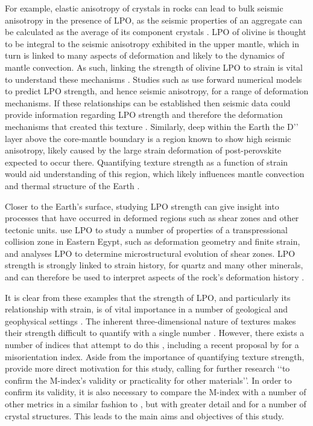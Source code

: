 \documentclass[a4paper,12pt,twoside]{report}
\numberwithin{equation}{chapter}
\begin{document}
For example, elastic anisotropy of crystals in rocks can lead to bulk seismic anisotropy in the presence of LPO, as the seismic properties of an aggregate can be calculated as the average of its component crystals \citep{Tommasi1999}. LPO of olivine is thought to be integral to the seismic anisotropy exhibited in the upper mantle, which in turn is linked to many aspects of deformation and likely to the dynamics of mantle convection. As such, linking the strength of olivine LPO to strain is vital to understand these mechanisms \citep[e.g.][]{Warren2008}. Studies such as \cite{Tommasi2000} use forward numerical models to predict LPO strength, and hence seismic anisotropy, for a range of deformation mechanisms. If these relationships can be established then seismic data could provide information regarding LPO strength and therefore the deformation mechanisms that created this texture \citep[see][for details of a number of other approaches to this problem]{Blackman2002}. Similarly, deep within the Earth the D\rq\rq{} layer \citep{Garnero2008} above the core-mantle boundary is a region known to show high seismic anisotropy, likely caused by the large strain deformation of post-perovskite expected to occur there. Quantifying texture strength as a function of strain would aid understanding of this region, which likely influences mantle convection and thermal structure of the Earth \citep{Miyagi2010}. 

Closer to the Earth's surface, studying LPO strength can give insight into processes that have occurred in deformed regions such as shear zones and other tectonic units. \cite{Unzog2000} use LPO to study a number of properties of a transpressional collision zone in Eastern Egypt, such as deformation geometry and finite strain, and \cite{Lloyd2004} analyses LPO to determine microstructural evolution of shear zones. LPO strength is strongly linked to strain history, for quartz and many other minerals, and can therefore be used to interpret aspects of the rock's deformation history \cite{Price1985}.

It is clear from these examples that the strength of LPO, and particularly its relationship with strain, is of vital importance in a number of geological and geophysical settings \citep[and many more besides, see][for more examples]{Wenk1999}. The inherent three-dimensional nature of textures makes their strength difficult to quantify with a single number \citep{Schaeben2007}. However, there exists a number of indices that attempt to do this \citep[e.g. the texture index][]{bunge1982texture}, including a recent proposal by \cite{Skemer} for a misorientation index. Aside from the importance of quantifying texture strength, \cite{Skemer} provide more direct motivation for this study, calling for further research \lq\lq{}to confirm the M-index's validity or practicality for other materials\rq\rq{}. In order to confirm its validity, it is also necessary to compare the M-index with a number of other metrics in a similar fashion to \cite{Mainprice}, but with greater detail and for a number of crystal structures. This leads to the main aims and objectives of this study.   
   
\end{document}
